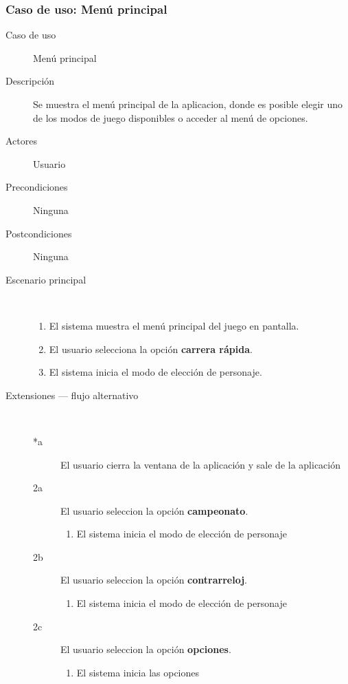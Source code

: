 \subsubsection{Caso de uso: Menú principal}

\begin{description}
    \item[Caso de uso] Menú principal
    \item[Descripción] Se muestra el menú principal de la aplicacion, donde es posible elegir uno de los modos de juego disponibles
    o acceder al menú de opciones.
    \item[Actores] Usuario
    \item[Precondiciones] Ninguna
    \item[Postcondiciones] Ninguna
    \item[Escenario principal] $\quad$
        \begin{enumerate}
            \item El sistema muestra el menú principal del juego en pantalla.
            \item El usuario selecciona la opción \textbf{carrera rápida}.
            \item El sistema inicia el modo de elección de personaje.
        \end{enumerate}
    \item[Extensiones --- flujo alternativo] $\quad$
        \begin{description}
            \item[*a ] El usuario cierra la ventana de la aplicación y sale de la aplicación
            \item[2a ] El usuario seleccion la opción \textbf{campeonato}.
            \begin{enumerate}
                \item El sistema inicia el modo de elección de personaje
            \end{enumerate}
            
            \item[2b ] El usuario seleccion la opción \textbf{contrarreloj}.
            \begin{enumerate}
                \item El sistema inicia el modo de elección de personaje
            \end{enumerate}
            
            \item[2c ] El usuario seleccion la opción \textbf{opciones}.
            \begin{enumerate}
                \item El sistema inicia las opciones
            \end{enumerate}
            

\end{description}
\end{description}
